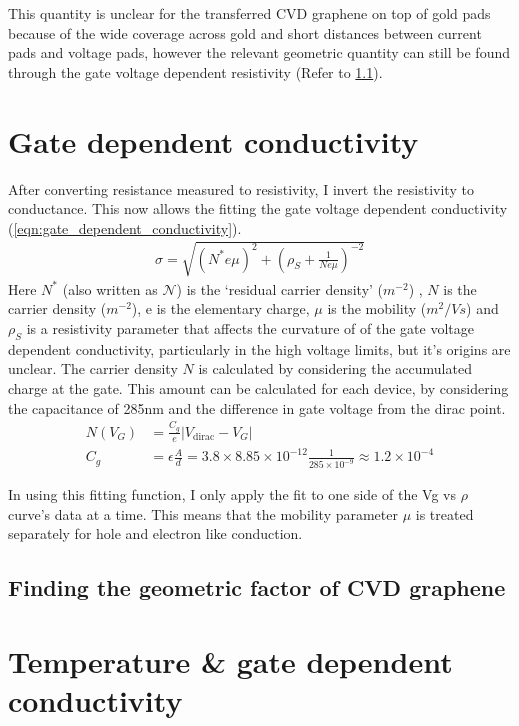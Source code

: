 \documentclass[../Matt_Gebert_Honours_Thesis.tex]{subfiles}
\begin{document}
This quantity is unclear for the transferred CVD graphene on top of gold pads because of the wide coverage across gold and short distances between current pads and voltage pads, however the relevant geometric quantity can still be found through the gate voltage dependent resistivity (Refer to \cref{sec:findinggeometricfactor}).

\section{Gate dependent conductivity}
After converting resistance measured to resistivity, I invert the resistivity to conductance. This now allows the fitting the gate voltage dependent conductivity (\cref{eqn:gate_dependent_conductivity}).
\begin{align}
\sigma = \sqrt{\left(N^{*} e \mu\right)^2 + \left(\rho_S + \frac{1}{N e \mu}\right)^{-2}} \label{eqn:gate_dependent_conductivity}
\end{align}
Here $N^{*}$ (also written as $\mathcal{N}$) is the `residual carrier density'  ($m^{-2}$) \cite{adam_self-consistent_2007}, $N$ is the carrier density ($m^{-2}$), e is the elementary charge, $\mu$ is the mobility ($m^2/Vs$) and $\rho_S$ is a resistivity parameter that affects the curvature of of the gate voltage dependent conductivity, particularly in the high voltage limits, but it's origins are unclear.
The carrier density $N$ is calculated by considering the accumulated charge at the gate. This amount can be calculated for each device, by considering the capacitance of 285nm \silicondioxide{} and the difference in gate voltage from the dirac point.
\begin{align}
	N(V_G) &= \frac{C_g}{e} \left|V_{\text{dirac}}-V_G\right|\\
	C_g &= \epsilon \frac{A}{d} = 3.8 \times 8.85 \times 10^{-12} \frac{1}{285\times 10^{-9}} \approx 1.2 \times 10^{-4}
\end{align}

In using this fitting function, I only apply the fit to one side of the Vg vs $\rho$ curve's data at a time. This means that the mobility parameter $\mu$ is treated separately for hole and electron like conduction.


\subsection{Finding the geometric factor of CVD graphene}\label{sec:findinggeometricfactor}

\section{Temperature \& gate dependent conductivity}
\end{document}
